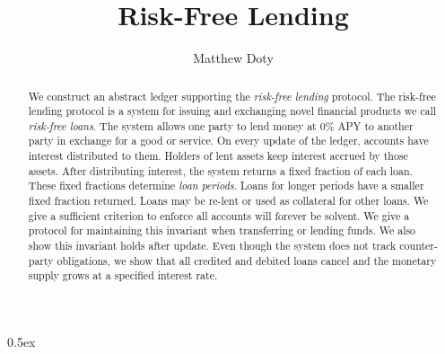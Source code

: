 \documentclass[11pt,a4paper]{article}
\begin{document}
\title{Risk-Free Lending}
\author{Matthew Doty}
\maketitle

\begin{abstract}
  We construct an abstract ledger supporting the \emph{risk-free
    lending} protocol. The risk-free lending protocol is a system for
  issuing and exchanging novel financial products we call
  \emph{risk-free loans}. The system allows one party to lend money at
  0\% APY to another party in exchange for a good or service. On every
  update of the ledger, accounts have interest distributed to them.
  Holders of lent assets keep interest accrued by those assets. After
  distributing interest, the system returns a fixed fraction of each
  loan. These fixed fractions determine \emph{loan periods}. Loans for
  longer periods have a smaller fixed fraction returned. Loans may be
  re-lent or used as collateral for other loans. We give a sufficient
  criterion to enforce all accounts will forever be solvent. We give a
  protocol for maintaining this invariant when transferring or lending
  funds. We also show this invariant holds after update. Even though
  the system does not track counter-party obligations, we show that
  all credited and debited loans cancel and the monetary supply grows
  at a specified interest rate.
\end{abstract}

\tableofcontents

\parindent 0pt\parskip 0.5ex



%
%
\end{document}

